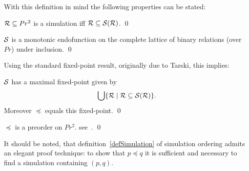 \noindent
With this definition in mind the following properties can be stated:

\begin{proposition}
${\cal R}\subseteq Pr^2$ is a simulation iff ${\cal R}\subseteq {\cal S(R)}$.
\label{propSim}\qed
\end{proposition}

\begin{proposition}
${\cal S}$ is a monotonic endofunction on the complete lattice of binary relations (over $Pr$) under inclusion.
\label{propMonotonic}\qed
\end{proposition}

\noindent
Using the standard fixed-point result, originally due to Tarski, this implies:

\begin{proposition}
${\cal S}$ has a maximal fixed-point given by
\[
\bigcup\{{\cal R}\mid {\cal R}\subseteq{\cal S(R)}\}.
\]
Moreover $\preceq$ equals this fixed-point.
\qed
\end{proposition}

\begin{proposition}
$\preceq$ is a preorder on $Pr^2$.
\proof see~\cite{Larsen}.
\qed
\end{proposition}

It should be noted, that definition~\ref{defSimulation} of simulation ordering admits an elegant proof technique: to show that $p\preceq q$ it is sufficient and necessary to find a simulation containing $(p,q)$.

